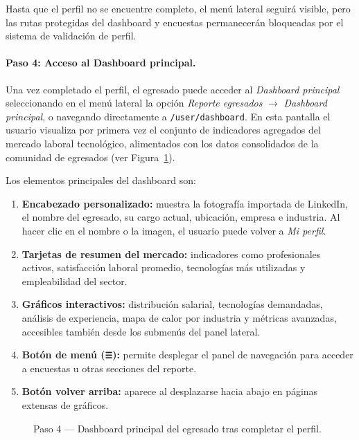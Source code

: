 Hasta que el perfil no se encuentre completo, el menú lateral seguirá visible, pero las rutas protegidas del dashboard y encuestas permanecerán bloqueadas por el sistema de validación de perfil.

\paragraph{Paso 4: Acceso al Dashboard principal.}

Una vez completado el perfil, el egresado puede acceder al \emph{Dashboard principal} seleccionando en el menú lateral la opción \emph{Reporte egresados} $\rightarrow$ \emph{Dashboard principal}, o navegando directamente a \texttt{/user/dashboard}. En esta pantalla el usuario visualiza por primera vez el conjunto de indicadores agregados del mercado laboral tecnológico, alimentados con los datos consolidados de la comunidad de egresados (ver Figura~\ref{fig:login-egresado-paso4}).

Los elementos principales del dashboard son:

\begin{enumerate}
\item \textbf{Encabezado personalizado:} muestra la fotografía importada de LinkedIn, el nombre del egresado, su cargo actual, ubicación, empresa e industria. Al hacer clic en el nombre o la imagen, el usuario puede volver a \emph{Mi perfil}.
\item \textbf{Tarjetas de resumen del mercado:} indicadores como profesionales activos, satisfacción laboral promedio, tecnologías más utilizadas y empleabilidad del sector.
\item \textbf{Gráficos interactivos:} distribución salarial, tecnologías demandadas, análisis de experiencia, mapa de calor por industria y métricas avanzadas, accesibles también desde los submenús del panel lateral.
\item \textbf{Botón de menú (\texttt{☰}):} permite desplegar el panel de navegación para acceder a encuestas u otras secciones del reporte.
\item \textbf{Botón volver arriba:} aparece al desplazarse hacia abajo en páginas extensas de gráficos.
\end{enumerate}

\begin{figure}[H]
\centering
{}
\caption{Paso 4 --- Dashboard principal del egresado tras completar el perfil.}
\label{fig:login-egresado-paso4}
\end{figure}

